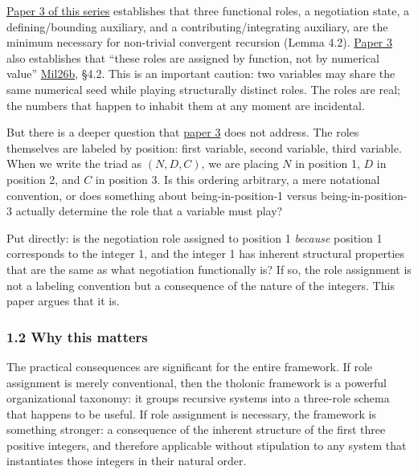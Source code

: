 \documentclass[
  11pt,
  letterpaper,
]{article}
\begin{document}
\href{https://github.com/baardev/truevalue/blob/main/docnav/Research/papers/3_minimal-recursive-triadic-framework/3_minimal-recursive-triadic-framework.pdf}{Paper
3 of this series} establishes that three functional roles, a negotiation
state, a defining/bounding auxiliary, and a contributing/integrating
auxiliary, are the minimum necessary for non-trivial convergent
recursion (Lemma 4.2).
\href{https://github.com/baardev/truevalue/blob/main/docnav/Research/papers/3_minimal-recursive-triadic-framework/3_minimal-recursive-triadic-framework.pdf}{Paper
3} also establishes that ``these roles are assigned by function, not by
numerical value''
\href{https://github.com/baardev/truevalue/blob/main/docnav/Research/papers/3_minimal-recursive-triadic-framework/3_minimal-recursive-triadic-framework.pdf}{Mil26b},
§4.2. This is an important caution: two variables may share the same
numerical seed while playing structurally distinct roles. The roles are
real; the numbers that happen to inhabit them at any moment are
incidental.

But there is a deeper question that
\href{https://github.com/baardev/truevalue/blob/main/docnav/Research/papers/3_minimal-recursive-triadic-framework/3_minimal-recursive-triadic-framework.pdf}{paper
3} does not address. The roles themselves are labeled by position: first
variable, second variable, third variable. When we write the triad as
\((N, D, C)\), we are placing \(N\) in position 1, \(D\) in position 2,
and \(C\) in position 3. Is this ordering arbitrary, a mere notational
convention, or does something about being-in-position-1 versus
being-in-position-3 actually determine the role that a variable must
play?

Put directly: is the negotiation role assigned to position 1
\emph{because} position 1 corresponds to the integer 1, and the integer
1 has inherent structural properties that are the same as what
negotiation functionally is? If so, the role assignment is not a
labeling convention but a consequence of the nature of the integers.
This paper argues that it is.

\subsubsection{1.2 Why this matters}\label{why-this-matters}

The practical consequences are significant for the entire framework. If
role assignment is merely conventional, then the tholonic framework is a
powerful organizational taxonomy: it groups recursive systems into a
three-role schema that happens to be useful. If role assignment is
necessary, the framework is something stronger: a consequence of the
inherent structure of the first three positive integers, and therefore
applicable without stipulation to any system that instantiates those
integers in their natural order.
\end{document}
